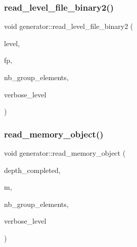 \subsubsection{\texorpdfstring{read\+\_\+level\+\_\+file\+\_\+binary2()}{read\_level\_file\_binary2()}}
{\footnotesize\ttfamily void generator\+::read\+\_\+level\+\_\+file\+\_\+binary2 (\begin{DoxyParamCaption}\item[{\mbox{\hyperlink{galois_8h_a09fddde158a3a20bd2dcadb609de11dc}{I\+NT}}}]{level,  }\item[{F\+I\+LE $\ast$}]{fp,  }\item[{\mbox{\hyperlink{galois_8h_a09fddde158a3a20bd2dcadb609de11dc}{I\+NT}} \&}]{nb\+\_\+group\+\_\+elements,  }\item[{\mbox{\hyperlink{galois_8h_a09fddde158a3a20bd2dcadb609de11dc}{I\+NT}}}]{verbose\+\_\+level }\end{DoxyParamCaption})}

\mbox{\label{classgenerator_afc49fd4b754ed0d44933f78e3c99d808}} 
\subsubsection{\texorpdfstring{read\+\_\+memory\+\_\+object()}{read\_memory\_object()}}
{\footnotesize\ttfamily void generator\+::read\+\_\+memory\+\_\+object (\begin{DoxyParamCaption}\item[{\mbox{\hyperlink{galois_8h_a09fddde158a3a20bd2dcadb609de11dc}{I\+NT}} \&}]{depth\+\_\+completed,  }\item[{\mbox{\hyperlink{classmemory__object}{memory\+\_\+object}} $\ast$}]{m,  }\item[{\mbox{\hyperlink{galois_8h_a09fddde158a3a20bd2dcadb609de11dc}{I\+NT}} \&}]{nb\+\_\+group\+\_\+elements,  }\item[{\mbox{\hyperlink{galois_8h_a09fddde158a3a20bd2dcadb609de11dc}{I\+NT}}}]{verbose\+\_\+level }\end{DoxyParamCaption})}

\mbox{\label{classgenerator_a8c1bb7a84af4d06942b7f94409d15f06}} 
